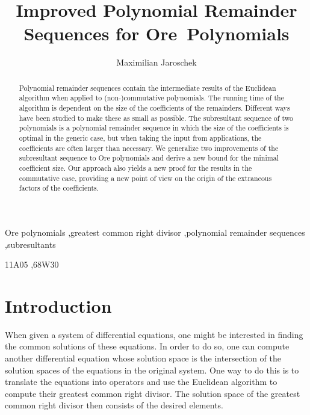 \documentclass[3p,11pt,preprint]{elsarticle}
\begin{document}
\begin{frontmatter}
  \title{Improved Polynomial Remainder Sequences for Ore~Polynomials}

  \author{Maximilian Jaroschek}
  \address{Research Institute for Symbolic Computation\\ Johannes Kepler University\\ A4040 Linz, Austria}

\begin{abstract}
Polynomial remainder sequences contain the intermediate results of the Euclidean algorithm when applied to (non-)commutative polynomials. The running time of the algorithm is dependent on the size of the coefficients of the remainders. Different ways have been studied to make these as small as possible. The subresultant sequence of two polynomials is a polynomial remainder sequence in which the size of the coefficients is optimal in the generic case, but when taking the input from applications, the coefficients are often larger than necessary. We generalize two improvements of the subresultant sequence to Ore polynomials and derive a new bound for the minimal coefficient size. Our approach also yields a new proof for the results in the commutative case, providing a new point of view on the origin of the extraneous factors of the coefficients.
\end{abstract}

\begin{keyword}
Ore polynomials \sep greatest common right divisor \sep polynomial remainder sequences \sep subresultants

11A05 \sep 68W30
\end{keyword}

\end{frontmatter}

\section{Introduction}

When given a system of differential equations, one might be interested in finding the common solutions of these equations. In order to do so, one can compute another differential equation whose solution space is the intersection of the solution spaces of the equations in the original system. One way to do this is to translate the equations into operators and use the Euclidean algorithm to compute their greatest common right divisor. The solution space of the greatest common right divisor then consists of the desired elements. 
\end{document}
